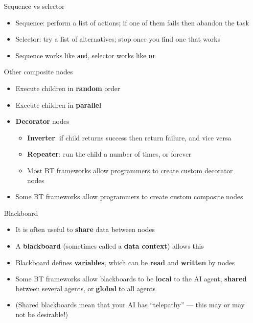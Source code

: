 \begin{frame}{Sequence vs selector}
	\begin{itemize}
		\pause\item Sequence: perform a list of actions; if one of them fails then abandon the task
		\pause\item Selector: try a list of alternatives; stop once you find one that works
		\pause\item Sequence works like \lstinline{and}, selector works like \lstinline{or}
	\end{itemize}
\end{frame}

\begin{frame}{Other composite nodes}
	\begin{itemize}
		\pause\item Execute children in \textbf{random} order
		\pause\item Execute children in \textbf{parallel}
		\pause\item \textbf{Decorator} nodes
		\begin{itemize}
			\pause\item \textbf{Inverter}: if child returns success then return failure, and vice versa
			\pause\item \textbf{Repeater}: run the child a number of times, or forever
			\pause\item Most BT frameworks allow programmers to create custom decorator nodes
		\end{itemize}
		\pause\item Some BT frameworks allow programmers to create custom composite nodes
	\end{itemize}
\end{frame}

\begin{frame}{Blackboard}
	\begin{itemize}
		\pause\item It is often useful to \textbf{share} data between nodes
		\pause\item A \textbf{blackboard} (sometimes called a \textbf{data context}) allows this
		\pause\item Blackboard defines \textbf{variables}, which can be \textbf{read} and \textbf{written} by nodes
		\pause\item Some BT frameworks allow blackboards to be \textbf{local} to the AI agent, \textbf{shared} between several agents, or \textbf{global} to all agents
		\pause\item (Shared blackboards mean that your AI has ``telepathy'' --- this may or may not be desirable!)
	\end{itemize}
\end{frame}


